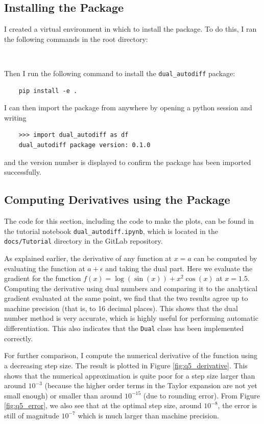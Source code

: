 \documentclass{article}
\begin{document}
\subsection{ Installing the Package }
I created a virtual environment in which to install the package. To do this, I ran the following commands in the root directory:
\begin{lstlisting}
    
\end{lstlisting}
Then I run the following command to install the \texttt{dual\_autodiff} package:
\begin{lstlisting}
    pip install -e .
\end{lstlisting}
I can then import the package from anywhere by opening a python session and writing
\begin{lstlisting}
    >>> import dual_autodiff as df
    dual_autodiff package version: 0.1.0
\end{lstlisting}
and the version number is displayed to confirm the package has been imported successfully.

\subsection{ Computing Derivatives using the Package } \label{compderivs}
The code for this section, including the code to make the plots, can be found in the tutorial notebook \texttt{dual\_autodiff.ipynb}, which is located in the \texttt{docs/Tutorial} directory in the GitLab repository.

As explained earlier, the derivative of any function at $x=a$ can be computed by evaluating the function at $a+\epsilon$ and taking the dual part. Here we evaluate the gradient for the function $ f(x) = \log(\sin(x)) + x^2 \cos(x) $ at $x=1.5$. Computing the derivative using dual numbers and comparing it to the analytical gradient evaluated at the same point, we find that the two results agree up to machine precision (that is, to 16 decimal places). This shows that the dual number method is very accurate, which is highly useful for performing automatic differentiation. This also indicates that the \texttt{Dual} class has been implemented correctly. 

For further comparison, I compute the numerical derivative of the function using a decreasing step size. The result is plotted in Figure \ref{fig:q5_derivative}. This shows that the numerical approximation is quite poor for a step size larger than around $10^{-3}$ (because the higher order terms in the Taylor expansion are not yet small enough) or smaller than around $10^{-15}$ (due to rounding error). From Figure \ref{fig:q5_error}, we also see that at the optimal step size, around $10^{-8}$, the error is still of magnitude $10^{-7}$ which is much larger than machine precision. 
\end{document}
